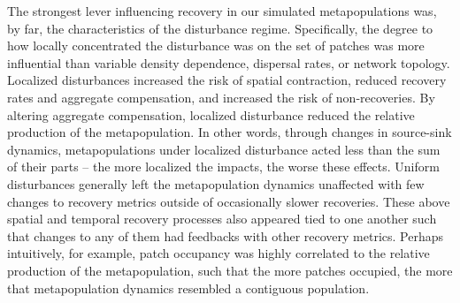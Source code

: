\documentclass[
]{article}
\begin{document}
The strongest lever influencing recovery in our simulated
metapopulations was, by far, the characteristics of the disturbance
regime. Specifically, the degree to how locally concentrated the
disturbance was on the set of patches was more influential than variable
density dependence, dispersal rates, or network topology. Localized
disturbances increased the risk of spatial contraction, reduced recovery
rates and aggregate compensation, and increased the risk of
non-recoveries. By altering aggregate compensation, localized
disturbance reduced the relative production of the metapopulation. In
other words, through changes in source-sink dynamics, metapopulations
under localized disturbance acted less than the sum of their parts --
the more localized the impacts, the worse these effects. Uniform
disturbances generally left the metapopulation dynamics unaffected with
few changes to recovery metrics outside of occasionally slower
recoveries. These above spatial and temporal recovery processes also
appeared tied to one another such that changes to any of them had
feedbacks with other recovery metrics. Perhaps intuitively, for example,
patch occupancy was highly correlated to the relative production of the
metapopulation, such that the more patches occupied, the more that
metapopulation dynamics resembled a contiguous population.
\end{document}
